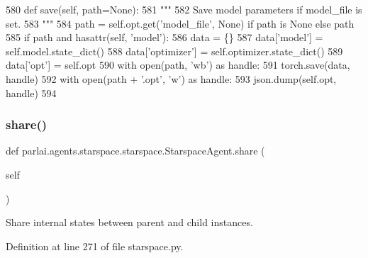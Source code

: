 \begin{DoxyCode}
580     \textcolor{keyword}{def }save(self, path=None):
581         \textcolor{stringliteral}{"""}
582 \textcolor{stringliteral}{        Save model parameters if model\_file is set.}
583 \textcolor{stringliteral}{        """}
584         path = self.opt.get(\textcolor{stringliteral}{'model\_file'}, \textcolor{keywordtype}{None}) \textcolor{keywordflow}{if} path \textcolor{keywordflow}{is} \textcolor{keywordtype}{None} \textcolor{keywordflow}{else} path
585         \textcolor{keywordflow}{if} path \textcolor{keywordflow}{and} hasattr(self, \textcolor{stringliteral}{'model'}):
586             data = \{\}
587             data[\textcolor{stringliteral}{'model'}] = self.model.state\_dict()
588             data[\textcolor{stringliteral}{'optimizer'}] = self.optimizer.state\_dict()
589             data[\textcolor{stringliteral}{'opt'}] = self.opt
590             with open(path, \textcolor{stringliteral}{'wb'}) \textcolor{keyword}{as} handle:
591                 torch.save(data, handle)
592             with open(path + \textcolor{stringliteral}{'.opt'}, \textcolor{stringliteral}{'w'}) \textcolor{keyword}{as} handle:
593                 json.dump(self.opt, handle)
594 
\end{DoxyCode}
\mbox{\label{classparlai_1_1agents_1_1starspace_1_1starspace_1_1StarspaceAgent_a4a03374eadb6aa60dcd01173f0f5aa6b}} 
\subsubsection{\texorpdfstring{share()}{share()}}
{\footnotesize\ttfamily def parlai.\+agents.\+starspace.\+starspace.\+Starspace\+Agent.\+share (\begin{DoxyParamCaption}\item[{}]{self }\end{DoxyParamCaption})}

\begin{DoxyVerb}Share internal states between parent and child instances.
\end{DoxyVerb}
 

Definition at line 271 of file starspace.\+py.


